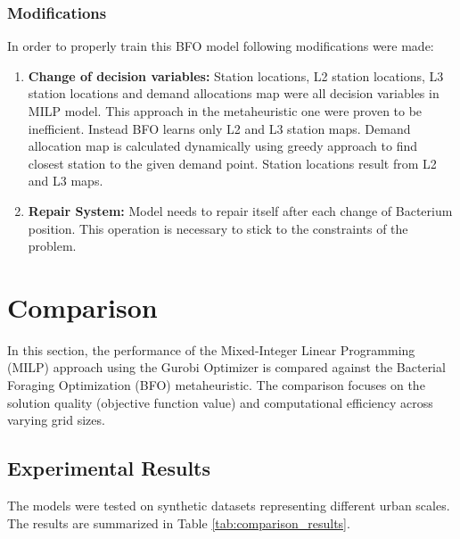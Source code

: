 \documentclass{article}
\begin{document}
\subsubsection{Modifications}
In order to properly train this BFO model following modifications were made:

\begin{enumerate}
    \item \textbf{Change of decision variables:} Station locations, L2 station locations, L3 station locations and demand allocations map were all decision variables in MILP model. This approach in the metaheuristic one were proven to be inefficient. Instead BFO \cite{das2009bacterial} learns only L2 and L3 station maps. Demand allocation map is calculated dynamically using greedy approach to find closest station to the given demand point. Station locations result from L2 and L3 maps.

    \item \textbf{Repair System:} Model needs to repair itself after each change of Bacterium position. This operation is necessary to
    stick to the constraints of the problem.
\end{enumerate}


\section{Comparison}
In this section, the performance of the Mixed-Integer Linear Programming (MILP) approach using the Gurobi Optimizer is compared against the Bacterial Foraging Optimization (BFO) metaheuristic. The comparison focuses on the solution quality (objective function value) and computational efficiency across varying grid sizes.

\subsection{Experimental Results}
The models were tested on synthetic datasets representing different urban scales. The results are summarized in Table \ref{tab:comparison_results}.

\begin{table}[h!]

\centering
\caption{Comparison of MILP (Gurobi) and Metaheuristic (BFO) results.}
\label{tab:comparison_results}
\medskip
{}

\end{table}
\end{document}
